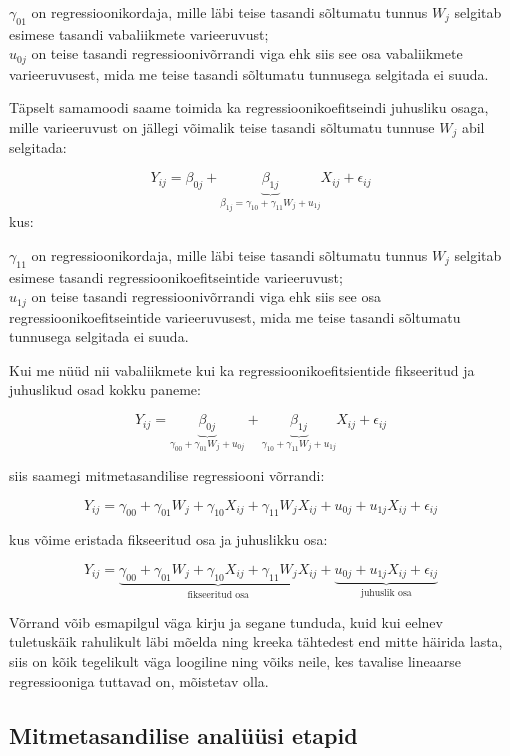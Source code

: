 \documentclass[
]{book}
\begin{document}
\(\gamma_{01}\) on regressioonikordaja, mille läbi teise tasandi sõltumatu tunnus \(W_j\) selgitab esimese tasandi vabaliikmete varieeruvust;\\
\(u_{0j}\) on teise tasandi regressioonivõrrandi viga ehk siis see osa vabaliikmete varieeruvusest, mida me teise tasandi sõltumatu tunnusega selgitada ei suuda.

Täpselt samamoodi saame toimida ka regressioonikoefitseindi juhusliku osaga, mille varieeruvust on jällegi võimalik teise tasandi sõltumatu tunnuse \(W_j\) abil selgitada:

\[Y_{ij} = \beta_{0j} + \underbrace{\beta_{1j}}_{\beta_{1j}= \gamma_{10}+ \gamma_{11}W_j + u_{1j}}X_{ij}+\epsilon_{ij}\]
kus:

\(\gamma_{11}\) on regressioonikordaja, mille läbi teise tasandi sõltumatu tunnus \(W_j\) selgitab esimese tasandi regressioonikoefitseintide varieeruvust;\\
\(u_{1j}\) on teise tasandi regressioonivõrrandi viga ehk siis see osa regressioonikoefitseintide varieeruvusest, mida me teise tasandi sõltumatu tunnusega selgitada ei suuda.

Kui me nüüd nii vabaliikmete kui ka regressioonikoefitsientide fikseeritud ja juhuslikud osad kokku paneme:

\[Y_{ij} = \underbrace{\beta_{0j}}_{\gamma_{00}+ \gamma_{01}W_j + u_{0j}} + \underbrace{\beta_{1j}}_{\gamma_{10}+ \gamma_{11}W_j + u_{1j}}X_{ij}+\epsilon_{ij}\]

siis saamegi mitmetasandilise regressiooni võrrandi:

\[Y_{ij} = \gamma_{00}+ \gamma_{01}W_j  + \gamma_{10}X_{ij}+ \gamma_{11}W_jX_{ij} + u_{0j} + u_{1j}X_{ij} + \epsilon_{ij}\]

kus võime eristada fikseeritud osa ja juhuslikku osa:

\[Y_{ij} = \underbrace{\gamma_{00}+ \gamma_{01}W_j  + \gamma_{10}X_{ij}+ \gamma_{11}W_jX_{ij}}_{\text{fikseeritud osa}} +  \underbrace{u_{0j} + u_{1j}X_{ij} + \epsilon_{ij}}_{\text{juhuslik osa}}\]

Võrrand võib esmapilgul väga kirju ja segane tunduda, kuid kui eelnev tuletuskäik rahulikult läbi mõelda ning kreeka tähtedest end mitte häirida lasta, siis on kõik tegelikult väga loogiline ning võiks neile, kes tavalise lineaarse regressiooniga tuttavad on, mõistetav olla.

\hypertarget{mitmetasandilise-analuxfcuxfcsi-etapid}{%
\subsection{Mitmetasandilise analüüsi etapid}\label{mitmetasandilise-analuxfcuxfcsi-etapid}}
\end{document}
